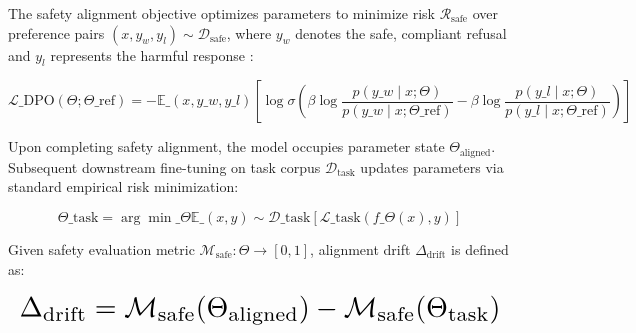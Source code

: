 \documentclass[10pt,twocolumn,letterpaper]{article}
\begin{document}
The safety alignment objective optimizes parameters to minimize risk $\mathcal{R}_{\text{safe}}$ over preference pairs $(x, y_w, y_l) \sim \mathcal{D}_{\text{safe}}$, where $y_w$ denotes the safe, compliant refusal and $y_l$ represents the harmful response \cite{arxiv_2305_18290}:

\begin{equation}
\label{eq:dpo\_loss}
\mathcal{L}\_{\text{DPO}}(\Theta; \Theta\_{\text{ref}}) = -\mathbb{E}\_{(x, y\_w, y\_l)}\left[ \log \sigma \left( \beta \log \frac{p(y\_w \mid x; \Theta)}{p(y\_w \mid x; \Theta\_{\text{ref}})} - \beta \log \frac{p(y\_l \mid x; \Theta)}{p(y\_l \mid x; \Theta\_{\text{ref}})} \right) \right]
\end{equation}

Upon completing safety alignment, the model occupies parameter state $\Theta_{\text{aligned}}$. Subsequent downstream fine-tuning on task corpus $\mathcal{D}_{\text{task}}$ updates parameters via standard empirical risk minimization:

\begin{equation}
\label{eq:downstream\_erm}
\Theta\_{\text{task}} = \arg\min\_\Theta \mathbb{E}\_{(x, y) \sim \mathcal{D}\_{\text{task}}} \left[ \mathcal{L}\_{\text{task}}(f\_\Theta(x), y) \right]
\end{equation}

Given safety evaluation metric $\mathcal{M}_{\text{safe}}: \Theta \to [0, 1]$, alignment drift $\Delta_{\text{drift}}$ is defined as:
















\begin{equation}
\resizebox{\columnwidth}{!}{$\displaystyle
\begin{aligned}
\Delta_{\text{drift}} = \mathcal{M}_{\text{safe}}(\Theta_{\text{aligned}}) - \mathcal{M}_{\text{safe}}(\Theta_{\text{task}})
\end{aligned}
$}
\end{equation}
\end{document}
